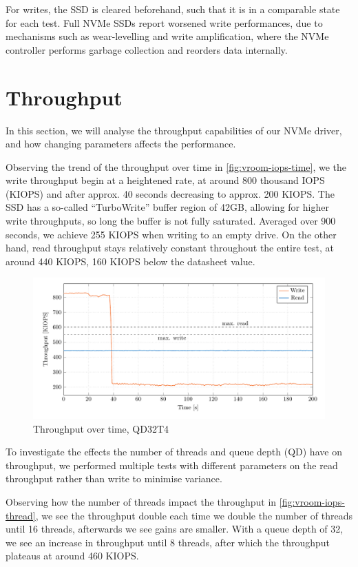 For writes, the SSD is cleared beforehand, such that it is in a comparable state for each test. Full NVMe SSDs report worsened write performances, due to mechanisms such as wear-levelling and write amplification, where the NVMe controller performs garbage collection and reorders data internally.

\section{Throughput}
In this section, we will analyse the throughput capabilities of our NVMe driver, and how changing parameters affects the performance.

Observing the trend of the throughput over time in \autoref{fig:vroom-iops-time}, we the write throughput begin at a heightened rate, at around 800 thousand IOPS (KIOPS) and after approx. 40 seconds decreasing to approx. 200 KIOPS. The SSD has a so-called ``TurboWrite'' buffer region of 42GB, allowing for higher write throughputs, so long the buffer is not fully saturated. Averaged over 900 seconds, we achieve 255 KIOPS when writing to an empty drive. On the other hand, read throughput stays relatively constant throughout the entire test, at around 440 KIOPS, 160 KIOPS below the datasheet value.

\begin{figure}[H]
  \centering
    \includegraphics[width=\textwidth]{figures/vroom-iops-time}
    \caption{Throughput over time, QD32T4}
    \label{fig:vroom-iops-time}
\end{figure}

To investigate the effects the number of threads and queue depth (QD) have on throughput, we performed multiple tests with different parameters on the read throughput rather than write to minimise variance.

Observing how the number of threads impact the throughput in \autoref{fig:vroom-iops-thread}, we see the throughput double each time we double the number of threads until 16 threads, afterwards we see gains are smaller. With a queue depth of 32, we see an increase in throughput until 8 threads, after which the throughput plateaus at around 460 KIOPS.


